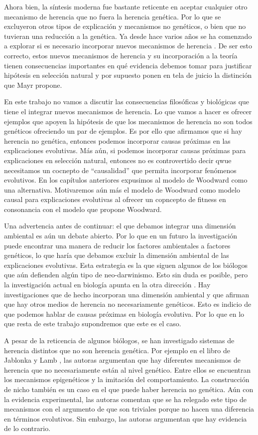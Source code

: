 Ahora bien, la síntesis moderna fue bastante reticente en aceptar cualquier otro mecanismo de herencia que no fuera la herencia genética. Por lo que se excluyeron otros tipos de explicación y mecanismos no genéticos, o bien que no tuvieran una reducción a la genética. Ya desde hace varios años se ha comenzado a explorar si es necesario incorporar nuevos mecanismos de herencia \cite{Jablonka2020}. De ser esto correcto, estos nuevos mecanismos de herencia y su incorporación a la teoría tienen consecuencias importantes en qué evidencia debemos tomar para justificar hipótesis en selección natural y por supuesto ponen en tela de juicio la distinción que Mayr propone.

En este trabajo no vamos a discutir las consecuencias filosóficas y biológicas que tiene el integrar nuevos mecanismos de herencia. Lo que vamos a hacer es ofrecer ejemplos que apoyen la hipótesis de que los mecanismos de herencia no son todos genéticos ofreciendo un par de ejemplos. Es por ello que afirmamos que si hay herencia no genética, entonces podemos incorporar causas próximas en las explicaciones evolutivas. Más aún, si podemos incorporar causas próximas para explicaciones en selección natural, entonces no es controvertido decir qwue necesitamos un cocnepto de ``causalidad'' que permita incorporar fenómenos evolutivos. En los capítulos anteriores expusimos al modelo de Woodward como una alternativa. Motivaremos aún más el modelo de Woodward como modelo causal para explicaciones evolutivas al ofrecer un copncepto de fitness en consonancia con el modelo que propone Woodward.

Una advertencia antes de continuar: el que debamos integrar una dimensión ambiental es aún un debate abierto. Por lo que en un futuro la investigación puede encontrar una manera de reducir los factores ambientales a factores genéticos, lo que haría que debamos excluir la dimensión ambiental de las explicaciones evolutivas. Esta estrategia es la que siguen algunos de los biólogos que aún defienden algún tipo de neo-darwinismo. Esto sin duda es posible, pero la investigación actual en biología apunta en la otra dirección  \cite{Bateson2014}. Hay investigaciones que de hecho incorporan una dimensión ambiental y que afirman que hay otros medios de herencia no necesariamente genéticos. Esto es indicio de que podemos hablar de causas próximas en biología evolutiva. Por lo que en lo que resta de este trabajo supondremos que este es el caso.

A pesar de la reticencia de algunos biólogos, se han investigado sistemas de herencia distintos que no son herencia genética. Por ejemplo en el libro de Jablonka y Lamb \citeyear{Jablonka2020}, las autoras argumentan que hay diferentes mecanismos de herencia que no necesariamente están al nivel genético. Entre ellos se encuentran los mecanismos epigenéticos y la imitación del comportamiento. La construcción de nicho también es un caso en el que puede haber herencia no genética. Aún con la evidencia experimental, las autoras comentan que se ha relegado este tipo de mecanismos con el argumento de que son triviales porque no hacen una diferencia en términos evolutivos. Sin embargo, las autoras argumentan que hay evidencia de lo contrario.

